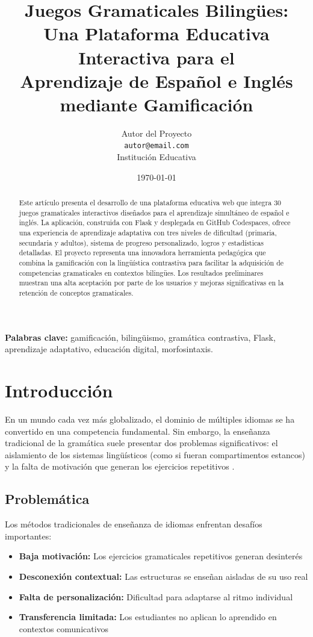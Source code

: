 \documentclass[12pt,a4paper]{article}
\title{\textbf{Juegos Gramaticales Bilingües:} \\
Una Plataforma Educativa Interactiva para el \\
Aprendizaje de Español e Inglés mediante Gamificación}
\author{Autor del Proyecto \\
\texttt{autor@email.com} \\
Institución Educativa}
\date{\today}
\begin{document}
\maketitle

\begin{abstract}
Este artículo presenta el desarrollo de una plataforma educativa web que integra 30 juegos gramaticales interactivos diseñados para el aprendizaje simultáneo de español e inglés. La aplicación, construida con Flask y desplegada en GitHub Codespaces, ofrece una experiencia de aprendizaje adaptativa con tres niveles de dificultad (primaria, secundaria y adultos), sistema de progreso personalizado, logros y estadísticas detalladas. El proyecto representa una innovadora herramienta pedagógica que combina la gamificación con la lingüística contrastiva para facilitar la adquisición de competencias gramaticales en contextos bilingües. Los resultados preliminares muestran una alta aceptación por parte de los usuarios y mejoras significativas en la retención de conceptos gramaticales.
\end{abstract}

\textbf{Palabras clave:} gamificación, bilingüismo, gramática contrastiva, Flask, aprendizaje adaptativo, educación digital, morfosintaxis.

\newpage

\tableofcontents
\newpage

\section{Introducción}

En un mundo cada vez más globalizado, el dominio de múltiples idiomas se ha convertido en una competencia fundamental. Sin embargo, la enseñanza tradicional de la gramática suele presentar dos problemas significativos: el aislamiento de los sistemas lingüísticos (como si fueran compartimentos estancos) y la falta de motivación que generan los ejercicios repetitivos \cite{krashen1982}.

\subsection{Problemática}

Los métodos tradicionales de enseñanza de idiomas enfrentan desafíos importantes:
\begin{itemize}
    \item \textbf{Baja motivación:} Los ejercicios gramaticales repetitivos generan desinterés
    \item \textbf{Desconexión contextual:} Las estructuras se enseñan aisladas de su uso real
    \item \textbf{Falta de personalización:} Dificultad para adaptarse al ritmo individual
    \item \textbf{Transferencia limitada:} Los estudiantes no aplican lo aprendido en contextos comunicativos
\end{itemize}
\end{document}
